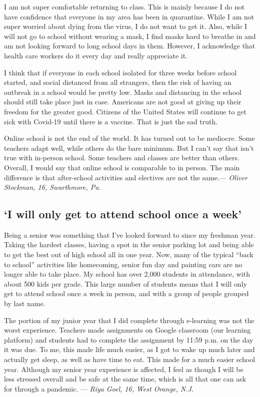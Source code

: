 I am not super comfortable returning to class. This is mainly because I
do not have confidence that everyone in my area has been in quarantine.
While I am not super worried about dying from the virus, I do not want
to get it. Also, while I will not go to school without wearing a mask, I
find masks hard to breathe in and am not looking forward to long school
days in them. However, I acknowledge that health care workers do it
every day and really appreciate it.

I think that if everyone in each school isolated for three weeks before
school started, and social distanced from all strangers, then the risk
of having an outbreak in a school would be pretty low. Masks and
distancing in the school should still take place just in case. Americans
are not good at giving up their freedom for the greater good. Citizens
of the United States will continue to get sick with Covid-19 until there
is a vaccine. That is just the sad truth.

Online school is not the end of the world. It has turned out to be
mediocre. Some teachers adapt well, while others do the bare minimum.
But I can't say that isn't true with in-person school. Some teachers and
classes are better than others. Overall, I would say that online school
is comparable to in person. The main difference is that after-school
activities and electives are not the same.--- \emph{Oliver Stockman, 16,
Swarthmore, Pa.}

\hypertarget{i-will-only-get-to-attend-school-once-a-week}{%
\subsection{`I will only get to attend school once a
week'}\label{i-will-only-get-to-attend-school-once-a-week}}

Being a senior was something that I've looked forward to since my
freshman year. Taking the hardest classes, having a spot in the senior
parking lot and being able to get the best out of high school all in one
year. Now, many of the typical ``back to school'' activities like
homecoming, senior fun day and painting cars are no longer able to take
place. My school has over 2,000 students in attendance, with about 500
kids per grade. This large number of students means that I will only get
to attend school once a week in person, and with a group of people
grouped by last name.

The portion of my junior year that I did complete through e-learning was
not the worst experience. Teachers made assignments on Google classroom
(our learning platform) and students had to complete the assignment by
11:59 p.m. on the day it was due. To me, this made life much easier, as
I got to wake up much later and actually get sleep, as well as have time
to eat. This made for a much easier school year. Although my senior year
experience is affected, I feel as though I will be less stressed overall
and be safe at the same time, which is all that one can ask for through
a pandemic. --- \emph{Riya Goel, 16, West Orange, N.J.}


